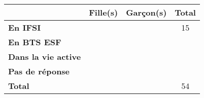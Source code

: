\begin{tabular}{|@{\ \ \ }l@{\ \ \ }|@{\ \ \ }c@{\ \ \ }|@{\ \ \ }c@{\ \ \ }|@{\ \ \ }c@{\ \ \ }|}
\hline
                            & \textbf{Fille(s)} & \textbf{Garçon(s)} & \textbf{Total} \\ \hline
\textbf{En IFSI}            &                   &                    & 15             \\ \hline
\textbf{En BTS ESF}         &                   &                    &                \\ \hline
\textbf{Dans la vie active} &                   &                    &                \\ \hline
\textbf{Pas de réponse}     &                   &                    &                \\ \hline
\textbf{Total}              &                   &                    & 54             \\ \hline
\end{tabular}